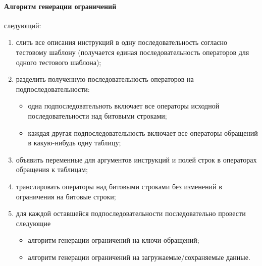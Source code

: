 \documentclass[14pt]{extreport}
\begin{document}
\paragraph{Алгоритм генерации ограничений} следующий:
\begin{enumerate}
    \item слить все описания инструкций в одну последовательность согласно тестовому шаблону (получается единая последовательность операторов для одного тестового шаблона);
    \item разделить полученную последовательность операторов на подпоследовательности:
            \begin{itemize}
                \item одна подпоследовательноть включает все операторы исходной последовательности над битовыми строками;
                \item каждая другая подпоследовательность включает все операторы обращений в какую-нибудь одну таблицу;
            \end{itemize}
    \item объявить переменные для аргументов инструкций и полей строк в операторах обращения к таблицам;
    \item транслировать операторы над битовыми строками без изменений в ограничения на битовые строки;
    \item для каждой оставшейся подпоследовательности последовательно провести следующие
            \begin{itemize}
                \item алгоритм генерации ограничений на ключи обращений;
                \item алгоритм генерации ограничений на загружаемые/сохраняемые данные.
            \end{itemize}
\end{enumerate}
\end{document}
